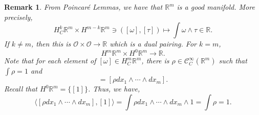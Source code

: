 \documentclass[8pt]{article}
\newtheorem{remark}{Remark}[section]
\newcommand{\R}[0]{\mathbb{R}}
\newcommand{\cinf}[0]{\mathcal{C}^\infty}
\begin{document}
\begin{remark}
  From Poincaré Lemmas, we have that $\R^m$ is a good manifold. More precisely,
  \begin{equation*}
    H^k_C\R^m\times H^{m-k}\R^m\ni([\omega],[\tau])\mapsto\int\omega\wedge\tau\in\R.
  \end{equation*}
  If $k\not=m$, then this is $\mathcal{O}\times\mathcal{O}\to\R$ which is a dual pairing. For $k=m$,
  \begin{equation*}
    H^m\R^m\times H^0\R^m\to\R.
  \end{equation*}
  Note that for each element of $[\omega]\in H^m_C\R^m$, there is $\rho\in\cinf_C(\R^m)$ such that $\int\rho=1$ and 
  \begin{equation*}
    [\omega]= [\rho dx_1\wedge\cdots\wedge dx_m].
  \end{equation*}
  Recall that $H^0\R^m = \{[1]\}$. Thus, we have,
  \begin{equation*}
    \langle[\rho dx_1\wedge\cdots\wedge dx_m],[1]\rangle = \int\rho dx_1\wedge\cdots\wedge dx_m\wedge 1 = \int\rho = 1.
  \end{equation*}
\end{remark}
\end{document}
